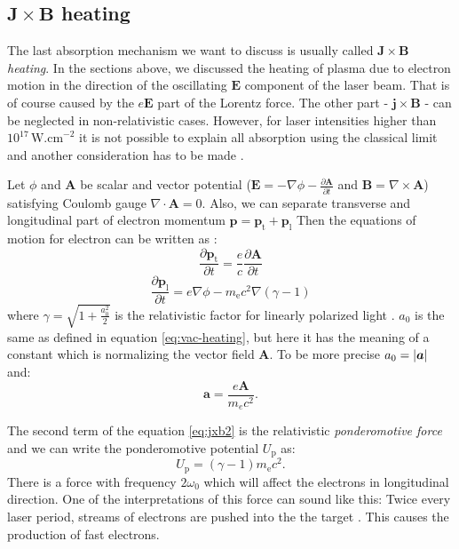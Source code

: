 \subsection*{$\bm{J}\times \bm{B}$ heating}
The last absorption mechanism we want to discuss is usually called $\bm{J}\times \bm{B}$ \textit{heating}. In the sections above, we discussed the heating of plasma due to electron motion in the direction of the oscillating $\bm{E}$ component of the laser beam. That is of course caused by the $e\bm{E}$ part of the Lorentz force. The other part - $\bm{j \times B}$ - can be neglected in non-relativistic cases. However, for laser intensities higher than $10^{17}\,\mathrm{W.cm}^{-2}$ it is not possible to explain all absorption using the classical limit and another consideration has to be made \cite{cai2006}.

Let $\phi$ and $\bm{A}$ be scalar and vector potential ($\bm{E} = -\nabla \phi -\frac{\partial \bm{A}}{\partial t}$ and $\bm{B} = \nabla \times \bm{A}$) satisfying Coulomb gauge $\nabla \cdot \bm{A} = 0$. Also, we can separate transverse and longitudinal part of electron momentum $\bm{p} = \bm{p}_\mathrm{t}+\bm{p}_\mathrm{l}$  Then the equations of motion for electron can be written as \cite{cai2006}:
\begin{equation}
	\frac{\partial \bm{p}_\mathrm{t}}{\partial t} = \frac{e}{c} \frac{\partial \bm{A}}{\partial t}
	\label{eq:jxb1}
\end{equation}
\begin{equation}
	\frac{\partial \bm{p}_\mathrm{l}}{\partial t} = e\nabla \phi - m_{\mathrm{e}}c^2\nabla (\gamma-1)
	\label{eq:jxb2}
\end{equation}
where $\gamma = \sqrt{1+\frac{a_0^2}{2}}$ is the relativistic factor for linearly polarized light \cite{absorption2}. $a_0$ is the same as defined in equation \ref{eq:vac-heating}, but here it has the meaning of a constant which is normalizing the vector field $\bm{A}$. To be more precise $a_0 = \lvert \bm{a} \rvert$ and:
\begin{equation}
	\bm{a} = \frac{e\bm{A}}{m_ec^2}.
\end{equation}

The second term of the equation \ref{eq:jxb2} is the relativistic \textit{ponderomotive force} and we can write the ponderomotive potential $U_\mathrm{p}$ as:
\begin{equation}
	U_\mathrm{p} = (\gamma - 1)m_{\mathrm{e}}c^2.
	\label{eq:ponderomotive-potential}
\end{equation}
There is a force with frequency $2\omega_0$ which will affect the electrons in longitudinal direction. One of the interpretations of this force can sound like this: Twice every laser period, streams of electrons are pushed into the the target \cite{cai2006}. This causes the production of fast electrons.

